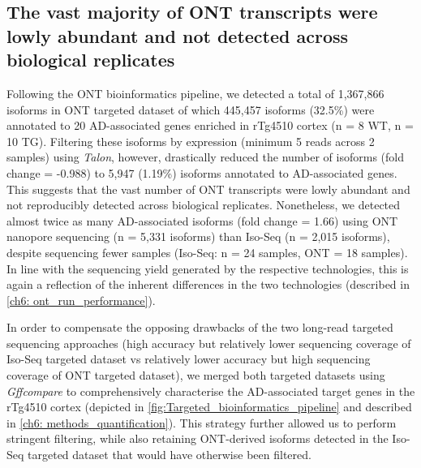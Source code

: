 \clearpage
\subsection{The vast majority of ONT transcripts were lowly abundant and not detected across biological replicates}
Following the ONT bioinformatics pipeline, we detected a total of 1,367,866 isoforms in ONT targeted dataset of which 445,457 isoforms (32.5\%) were annotated to 20 AD-associated genes enriched in rTg4510 cortex (n = 8 WT, n = 10 TG). Filtering these isoforms by expression (minimum 5 reads across 2 samples) using \textit{Talon}, however, drastically reduced the number of isoforms (fold change = -0.988) to 5,947 (1.19\%) isoforms annotated to AD-associated genes. This suggests that the vast number of ONT transcripts were lowly abundant and not reproducibly detected across biological replicates. Nonetheless, we detected almost twice as many AD-associated isoforms (fold change = 1.66) using ONT nanopore sequencing (n = 5,331 isoforms) than Iso-Seq (n = 2,015 isoforms), despite sequencing fewer samples (Iso-Seq: n = 24 samples, ONT = 18 samples). In line with the sequencing yield generated by the respective technologies, this is again a reflection of the inherent differences in the two technologies (described in \cref{ch6: ont_run_performance}). 

In order to compensate the opposing drawbacks of the two long-read targeted sequencing approaches (high accuracy but relatively lower sequencing coverage of Iso-Seq targeted dataset vs relatively lower accuracy but high sequencing coverage of ONT targeted dataset), we merged both targeted datasets using \textit{Gffcompare} to comprehensively characterise the AD-associated target genes in the rTg4510 cortex (depicted in \cref{fig:Targeted_bioinformatics_pipeline} and described in \cref{ch6: methods_quantification}). This strategy further allowed us to perform stringent filtering, while also retaining ONT-derived isoforms detected in the Iso-Seq targeted dataset that would have otherwise been filtered. 

